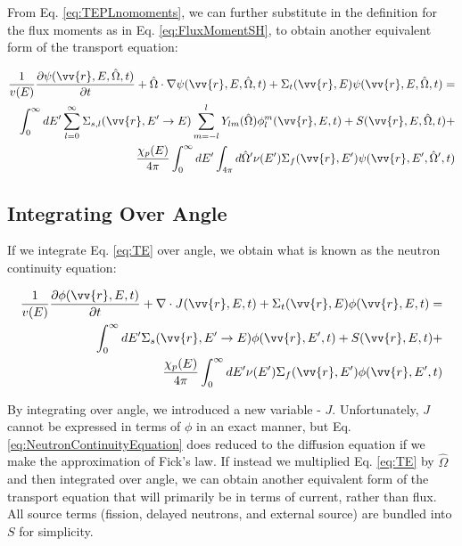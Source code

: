 \documentclass[10pt]{article}
\begin{document}
\begin{flushleft}
From Eq. \eqref{eq:TEPLnomoments}, we can further substitute in the definition for the flux moments as in Eq. \ref{eq:FluxMomentSH},  to obtain another equivalent form of the transport equation:

\begin{equation}
\label{eq:TEPL}
\begin{aligned}
\frac{1}{v(E)} \frac{\partial\psi(\vv{r}, E, \hat{\Omega},t)}{\partial t} +
 \hat{\Omega}\cdot\nabla\psi(\vv{r}, E, \hat{\Omega},t) + 
 \Sigma_t(\vv{r},E)\psi(\vv{r}, E, \hat{\Omega},t) = \\
 \int_{0}^{\infty}dE' \sum_{l=0}^{\infty} \Sigma_{s,l}(\vv{r}, E'\rightarrow E) \sum_{m=-l}^{l} Y_{lm}(\hat{\Omega})\phi_l^m(\vv{r}, E, t) + S(\vv{r}, E, \hat{\Omega},t)+\\
\frac{\chi_p(E)}{4\pi} \int_{0}^{\infty} dE'\int_{4\pi}^{} d\hat{\Omega}'\nu(E')\Sigma_f(\vv{r}, E')\psi(\vv{r}, E', \hat{\Omega}',t)\\
\end{aligned}
\end{equation}

\subsection{Integrating Over Angle}

 If we integrate Eq. \ref{eq:TE} over angle, we obtain what is known as the neutron continuity equation:

\begin{equation}
\label{eq:NeutronContinuityEquation}
\begin{aligned}
\frac{1}{v(E)} \frac{\partial\phi(\vv{r}, E, t)}{\partial t} +
 \nabla\cdot J(\vv{r}, E, t) + 
 \Sigma_t(\vv{r},E)\phi(\vv{r}, E, t) = \\
 \int_{0}^{\infty}dE' \Sigma_s(\vv{r}, E'\rightarrow E)\phi(\vv{r}, E', t) + S(\vv{r}, E, t)+\\
 \frac{\chi_p(E)}{4\pi} \int_{0}^{\infty} dE'\nu(E')\Sigma_f(\vv{r}, E')\phi(\vv{r}, E',t)
\end{aligned}
\end{equation}

By integrating over angle, we introduced a new variable - \(J\). Unfortunately, \(J\) cannot be expressed in terms of \(\phi\) in an exact manner, but Eq. \ref{eq:NeutronContinuityEquation} does reduced to the diffusion equation if we make the approximation of Fick's law. If instead we multiplied Eq. \ref{eq:TE} by \(\hat{\Omega}\) and then integrated over angle, we can obtain another equivalent form of the transport equation that will primarily be in terms of current, rather than flux. All source terms (fission, delayed neutrons, and external source) are bundled into \(S\) for simplicity. 


\end{flushleft}
\end{document}
